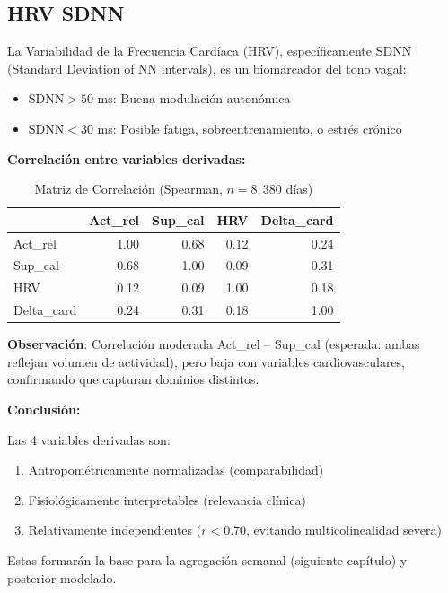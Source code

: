 \documentclass[12pt,letterpaper,twoside]{report}
\begin{document}
\subsection{HRV SDNN}

La Variabilidad de la Frecuencia Cardíaca (HRV), específicamente SDNN (Standard Deviation of NN intervals), es un biomarcador del tono vagal:
\begin{itemize}[noitemsep]
    \item $\text{SDNN} > 50$ ms: Buena modulación autonómica
    \item $\text{SDNN} < 30$ ms: Posible fatiga, sobreentrenamiento, o estrés crónico
\end{itemize}

\begin{calculobox}
\textbf{Correlación entre variables derivadas:}

\begin{table}[H]
\centering
\begin{tabular}{@{}lrrrr@{}}
\toprule
 & \textbf{Act\_rel} & \textbf{Sup\_cal} & \textbf{HRV} & \textbf{Delta\_card} \\
\midrule
Act\_rel     & 1.00 & 0.68 & 0.12 & 0.24 \\
Sup\_cal     & 0.68 & 1.00 & 0.09 & 0.31 \\
HRV          & 0.12 & 0.09 & 1.00 & 0.18 \\
Delta\_card  & 0.24 & 0.31 & 0.18 & 1.00 \\
\bottomrule
\end{tabular}
\caption{Matriz de Correlación (Spearman, $n=8,380$ días)}
\label{tab:derived_corr}
\end{table}

\textbf{Observación}: Correlación moderada Act\_rel -- Sup\_cal (esperada: ambas reflejan volumen de actividad), pero baja con variables cardiovasculares, confirmando que capturan dominios distintos.
\end{calculobox}

\begin{conclusionbox}
\textbf{Conclusión:}

Las 4 variables derivadas son:
\begin{enumerate}[noitemsep]
    \item Antropométricamente normalizadas (comparabilidad)
    \item Fisiológicamente interpretables (relevancia clínica)
    \item Relativamente independientes ($r < 0.70$, evitando multicolinealidad severa)
\end{enumerate}

Estas formarán la base para la agregación semanal (siguiente capítulo) y posterior modelado.
\end{conclusionbox}
\end{document}
